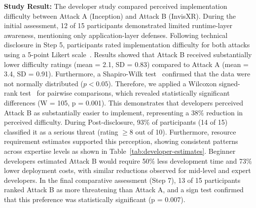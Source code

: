 \documentclass[letterpaper,twocolumn,10pt]{article}
\begin{document}
\textbf{Study Result:} The developer study compared perceived implementation difficulty between Attack A (Inception) and Attack B (InvisXR). During the initial assessment, 12 of 15 participants demonstrated limited runtime-layer awareness, mentioning only application-layer defenses. Following technical disclosure in Step 5, participants rated implementation difficulty for both attacks using a 5-point Likert scale~\cite{nemoto2014likert}. Results showed that Attack B received substantially lower difficulty ratings (mean = 2.1, SD = 0.83) compared to Attack A (mean = 3.4, SD = 0.91). Furthermore, a Shapiro-Wilk test~\cite{razali2011power} confirmed that the data were not normally distributed ($p < 0.05$). Therefore, we applied a Wilcoxon signed-rank test~\cite{taheri2013generalization} for pairwise comparisons, which revealed statistically significant differences (W = 105, p = 0.001). This demonstrates that developers perceived Attack B as substantially easier to implement, representing a 38\% reduction in perceived difficulty. During Post-disclosure, 93\% of participants (14 of 15) classified it as a serious threat (rating $\geq 8$ out of 10). Furthermore, resource requirement estimates supported this perception, showing consistent patterns across expertise levels as shown in Table~\ref{tab:developer-estimates}. Beginner developers estimated Attack B would require 50\% less development time and 73\% lower deployment costs, with similar reductions observed for mid-level and expert developers. In the final comparative assessment (Step 7), 13 of 15 participants ranked Attack B as more threatening than Attack A, and a sign test confirmed that this preference was statistically significant (p = 0.007). 
\end{document}
